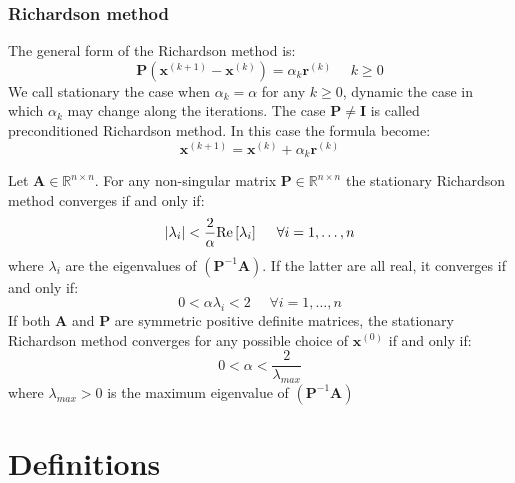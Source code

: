 \documentclass[12pt, a4paper]{report}
\begin{document}
    \subsection{Richardson method}
    The general form of the Richardson method is: 
    \[\boldsymbol{P}(\boldsymbol{x}^{(k+1)}-\boldsymbol{x}^{(k)})=\alpha_k\boldsymbol{r}^{(k)} \:\:\:\:\:\: k \geq 0\]
    We call stationary the case when $\alpha_k=\alpha$ for any $k \geq 0$, dynamic the case in which $\alpha_k$ may change along the iterations. The case 
    $\boldsymbol{P} \neq \boldsymbol{I}$ is called preconditioned Richardson method. In this case the formula become: 
    \[\boldsymbol{x}^{(k+1)}=\boldsymbol{x}^{(k)}+\alpha_k \boldsymbol{r}^{(k)}\]
    \begin{proposition}
        Let $\boldsymbol{A} \in \mathbb{R}^{n \times n}$. For any non-singular matrix $\boldsymbol{P} \in \mathbb{R}^{n \times n}$ the stationary Richardson method converges
        if and only if: 
        \[\left\lvert \lambda_i\right\rvert < \dfrac{2}{\alpha} \textnormal{Re}\left[\lambda_i\right] \:\:\:\:\:\:\forall i=1,\dots,n\]
        where $\lambda_i$ are the eigenvalues of $(\boldsymbol{P}^{-1}\boldsymbol{A})$. If the latter are all real, it converges if and only if: 
        \[0 < \alpha\lambda_i<2 \:\:\:\:\:\:\forall i=1,\dots,n\]
        If both $\boldsymbol{A}$ and $\boldsymbol{P}$ are symmetric positive definite matrices, the stationary Richardson method converges for any possible choice of 
        $\boldsymbol{x}^{(0)}$ if and only if: 
        \[0 < \alpha < \dfrac{2}{\lambda_{max}}\]
        where $\lambda_{max} >0$ is the maximum eigenvalue of $(\boldsymbol{P}^{-1} \boldsymbol{A})$
    \end{proposition}












\newpage

\chapter{Definitions}
\end{document}
